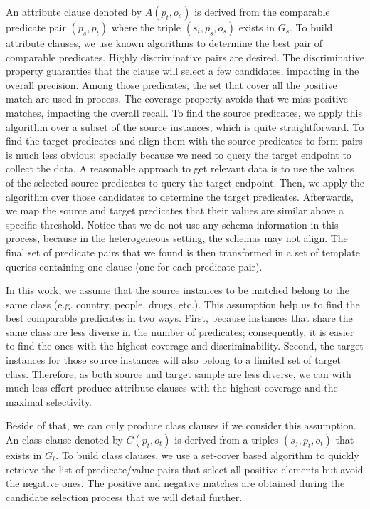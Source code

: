 An attribute clause denoted by $A(p_t,o_s)$ is derived from the comparable predicate pair $(p_s, p_t)$ where the triple $(s_i, p_s, o_s)$ exists in $G_s$. To build attribute clauses, we use known algorithms to determine the best pair of comparable predicates. Highly discriminative pairs are desired. The discriminative property guaranties that the clause will select a few candidates, impacting in the overall precision. Among those predicates, the set that cover all the positive match are used in process. The coverage property avoids that we miss positive matches, impacting the overall recall. To find the source predicates, we apply this algorithm over a subset of the source instances, which is quite straightforward. To find the target predicates and align them with the source predicates to form pairs is much less obvious; specially because we need to query the target endpoint to collect the data. A reasonable approach to get relevant data is to use the values of the selected source predicates to query the target endpoint. Then, we apply the algorithm over those candidates to determine the target predicates. Afterwards, we map the source and target predicates that their values are similar above a specific threshold. Notice that we do not use any schema information in this process, because in the heterogeneous setting, the schemas may not align. The final set of predicate pairs that we found is then transformed in a set of template queries containing one clause (one for each predicate pair).

In this work, we assume that the source instances to be matched belong to the same class (e.g. country, people, drugs, etc.). This assumption help us to find the best comparable predicates in two ways. First, because instances that share the same class are less diverse in the number of predicates; consequently, it is easier to find the ones with the highest coverage and discriminability. Second, the target instances for those source instances will also belong to a limited set of target class. Therefore, as both source and target sample are less diverse, we can with much less effort produce attribute clauses with the highest coverage and the maximal selectivity.

Beside of that, we can only produce class clauses if we consider this assumption. An class clause denoted by $C(p_t,o_t)$ is derived from a triples $(s_j, p_t, o_t)$ that exists in $G_t$. To build class clauses, we use a set-cover based algorithm \cite{DBLP:conf/soda/CarrDKM00} to quickly retrieve the list of predicate/value pairs that select all positive elements but avoid the negative ones. The positive and negative matches are obtained during the candidate selection process that we will detail further.

